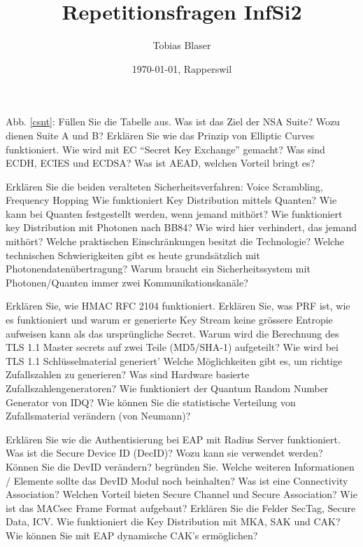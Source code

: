 \documentclass[ngerman,a4paper,12pt]{scrreprt}
\title{Repetitionsfragen InfSi2}
\author{Tobias Blaser}
\date{\today{}, Rapperswil}
\begin{document}
\tableofcontents
\clearpage

\ol
	\li Abb. \ref{csnt}: Füllen Sie die Tabelle aus.
	\li Was ist das Ziel der NSA Suite? Wozu dienen Suite A und B?
	\li Erklären Sie wie das Prinzip von Elliptic Curves funktioniert.
	\li Wie wird mit EC ``Secret Key Exchange'' gemacht?
	\li Was sind ECDH, ECIES und ECDSA?
	\li Was ist AEAD, welchen Vorteil bringt es?
\olS


\olR
	\li Erklären Sie die beiden veralteten Sicherheitsverfahren: Voice Scrambling, Frequency Hopping
	\li Wie funktioniert Key Distribution mittels Quanten?
	\li Wie kann bei Quanten festgestellt werden, wenn jemand mithört?
	\li Wie funktioniert key Distribution mit Photonen nach BB84? Wie wird hier verhindert, das jemand mithört? Welche praktischen Einschränkungen besitzt die Technologie?
	\li Welche technischen Schwierigkeiten gibt es heute grundsätzlich mit Photonendatenübertragung?
	\li Warum braucht ein Sicherheitssystem mit Photonen/Quanten immer zwei Kommunikationskanäle?
\olS


\olR
	\li Erklären Sie, wie HMAC RFC 2104 funktioniert.
	\li Erklären Sie, was PRF ist, wie es funktioniert und warum er generierte Key Stream keine grössere Entropie aufweisen kann als das ursprüngliche Secret.
	\li Warum wird die Berechnung des TLS 1.1 Master secrets auf zwei Teile (MD5/SHA-1) aufgeteilt? Wie wird bei TLS 1.1 Schlüsselmaterial generiert'
	\li Welche Möglichkeiten gibt es, um richtige Zufallszahlen zu generieren?
	\li Was sind Hardware basierte Zufallszahlengeneratoren?
	\li Wie funktioniert der Quantum Random Number Generator von IDQ?
	\li Wie können Sie die statistische Verteilung von Zufallsmaterial verändern (von Neumann)?
\olS


\olR
	\li Erklären Sie wie die Authentisierung bei EAP mit Radius Server funktioniert.
	\li Was ist die Secure Device ID (DecID)? Wozu kann sie verwendet werden? Können Sie die DevID verändern? begründen Sie. Welche weiteren Informationen / Elemente sollte das DevID Modul noch beinhalten?
	\li Was ist eine Connectivity Association? Welchen Vorteil bieten Secure Channel und Secure Association?
	\li Wie ist das MACsec Frame Format aufgebaut? Erklären Sie die Felder SecTag, Secure Data, ICV.
	\li Wie funktioniert die Key Distribution mit MKA, SAK und CAK?
	\li Wie können Sie mit EAP dynamische CAK's ermöglichen?
\olS
\end{document}
